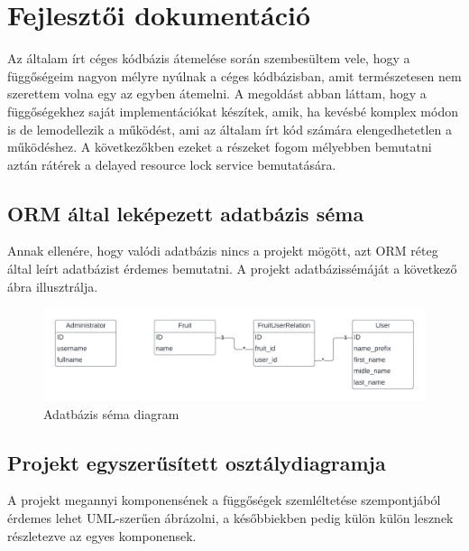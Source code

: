 \chapter{Fejlesztői dokumentáció}
\label{ch:impl}

Az általam írt céges kódbázis átemelése során szembesültem vele, hogy a függőségeim nagyon mélyre nyúlnak a céges kódbázisban, amit természetesen nem szerettem volna egy az egyben átemelni. A megoldást abban láttam, hogy a függőségekhez saját implementációkat készítek, amik, ha kevésbé komplex módon is de lemodellezik a működést, ami az általam írt kód számára elengedhetetlen a működéshez. A következőkben ezeket a részeket fogom mélyebben bemutatni aztán rátérek a delayed resource lock service bemutatására.

\section{ORM által leképezett adatbázis séma}

Annak ellenére, hogy valódi adatbázis nincs a projekt mögött, azt ORM réteg által leírt adatbázist érdemes bemutatni. A projekt adatbázissémáját a következő ábra illusztrálja.

\begin{figure}[H]
	\centering
	\includegraphics[width=1\textwidth]{images/db_scheme.png}
	\caption{Adatbázis séma diagram}
	\label{fig:main_window}
\end{figure}

\section{Projekt egyszerűsített osztálydiagramja}

A projekt megannyi komponensének a függőségek szemléltetése szempontjából érdemes lehet UML-szerűen ábrázolni, a későbbiekben pedig külön külön lesznek részletezve az egyes komponensek.

